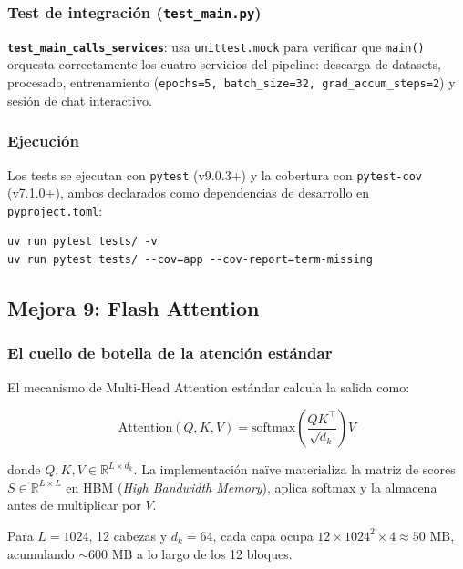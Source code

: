 \subsubsection*{Test de integración (\texttt{test\_main.py})}

\textbf{\texttt{test\_main\_calls\_services}}: usa \texttt{unittest.mock} para verificar que \texttt{main()} orquesta correctamente los cuatro servicios del pipeline: descarga de datasets, procesado, entrenamiento (\texttt{epochs=5, batch\_size=32, grad\_accum\_steps=2}) y sesión de chat interactivo.

\subsubsection*{Ejecución}

Los tests se ejecutan con \texttt{pytest} (v9.0.3+) y la cobertura con \texttt{pytest-cov} (v7.1.0+), ambos declarados como dependencias de desarrollo en \texttt{pyproject.toml}:

\begin{verbatim}
uv run pytest tests/ -v
uv run pytest tests/ --cov=app --cov-report=term-missing
\end{verbatim}


\subsection{Mejora 9: Flash Attention}

\subsubsection{El cuello de botella de la atención estándar}

El mecanismo de Multi-Head Attention estándar calcula la salida como:

\begin{equation}
    \text{Attention}(Q, K, V) = \text{softmax}\!\left(\frac{QK^\top}{\sqrt{d_k}}\right) V
\end{equation}

donde $Q, K, V \in \mathbb{R}^{L \times d_k}$. La implementación naïve materializa la matriz de scores $S \in \mathbb{R}^{L \times L}$ en HBM (\textit{High Bandwidth Memory}), aplica softmax y la almacena antes de multiplicar por $V$.

Para $L = 1024$, 12 cabezas y $d_k = 64$, cada capa ocupa $12 \times 1024^2 \times 4 \approx 50\text{ MB}$, acumulando $\sim\!600\text{ MB}$ a lo largo de los 12 bloques.

